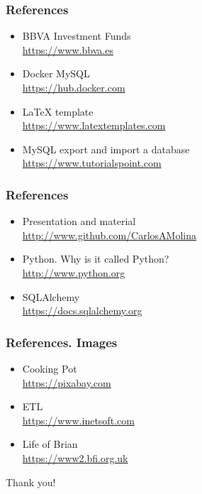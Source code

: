 \documentclass{beamer}
\begin{document}
\begin{frame}
\frametitle{References}
\begin{itemize}
\item BBVA Investment Funds\\
\href{https://www.bbva.es/personas/productos/fondos/por-tipo-de-activo.html}{https://www.bbva.es}
\item Docker MySQL\\
\href{https://hub.docker.com/\_/mysql/}{https://hub.docker.com}
\item LaTeX template\\
\href{https://www.latextemplates.com/template/beamer-presentation}{https://www.latextemplates.com}
\item MySQL export and import a database\\
\href{https://www.tutorialspoint.com/mysql/mysql-database-export.htm}{https://www.tutorialspoint.com}\\
\end{itemize}
\end{frame}

\begin{frame}
\frametitle{References}
\begin{itemize}
\item Presentation and material\\
\href{https://github.com/CarlosAMolina/workshop-python-pandas}{http://www.github.com/CarlosAMolina}
\item Python. Why is it called Python?\\
\href{http://www.python.org/doc/faq/general/\#why-is-it-called-python}{http://www.python.org}
\item SQLAlchemy\\
\href{https://docs.sqlalchemy.org/en/14/core/engines.html}{https://docs.sqlalchemy.org}
\end{itemize}
\end{frame}

\begin{frame}
\frametitle{References. Images}
\begin{itemize}
\item Cooking Pot\\
\href{https://pixabay.com/vectors/fire-flame-pot-burn-boil-stew-40252/}{https://pixabay.com}
\item ETL\\
\href{https://www.inetsoft.com/business/solutions/etl\_definition\_advantages\_and\_disadvantages/}{https://www.inetsoft.com}
\item Life of Brian\\
\href{https://www2.bfi.org.uk/news-opinion/news-bfi/announcements/bfi-announce-programme-its-monty-python-50}{https://www2.bfi.org.uk}
\end{itemize}
\end{frame}

\begin{frame}
\Huge{\centerline{Thank you!}}
\end{frame}
\end{document}
